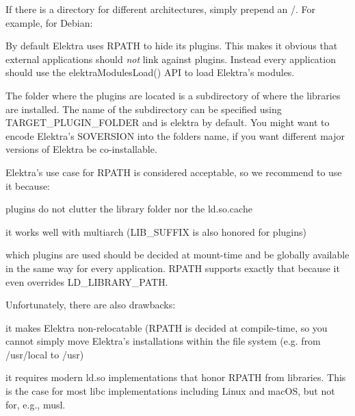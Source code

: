 \begin{DoxyCode}{0}
\end{DoxyCode}


If there is a directory for different architectures, simply prepend an {\ttfamily /}. For example, for Debian\+:


\begin{DoxyCode}{0}
\end{DoxyCode}


By default Elektra uses {\ttfamily R\+P\+A\+TH} to hide its plugins. This makes it obvious that external applications should {\itshape not} link against plugins. Instead every application should use the {\ttfamily elektra\+Modules\+Load()} A\+PI to load Elektra’s modules.

The folder where the plugins are located is a subdirectory of where the libraries are installed. The name of the subdirectory can be specified using {\ttfamily T\+A\+R\+G\+E\+T\+\_\+\+P\+L\+U\+G\+I\+N\+\_\+\+F\+O\+L\+D\+ER} and is {\ttfamily elektra} by default. You might want to encode Elektra’s {\ttfamily S\+O\+V\+E\+R\+S\+I\+ON} into the folders name, if you want different major versions of Elektra be co-\/installable.

Elektra’s use case for {\ttfamily R\+P\+A\+TH} is considered acceptable, so we recommend to use it because\+:


\begin{DoxyItemize}
\item plugins do not clutter the library folder nor the {\ttfamily ld.\+so.\+cache}
\item it works well with multiarch ({\ttfamily L\+I\+B\+\_\+\+S\+U\+F\+F\+IX} is also honored for plugins)
\item which plugins are used should be decided at mount-\/time and be globally available in the same way for every application. {\ttfamily R\+P\+A\+TH} supports exactly that because it even overrides {\ttfamily L\+D\+\_\+\+L\+I\+B\+R\+A\+R\+Y\+\_\+\+P\+A\+TH}.
\end{DoxyItemize}

Unfortunately, there are also drawbacks\+:


\begin{DoxyItemize}
\item it makes Elektra non-\/relocatable ({\ttfamily R\+P\+A\+TH} is decided at compile-\/time, so you cannot simply move Elektra’s installations within the file system (e.\+g. from {\ttfamily /usr/local} to {\ttfamily /usr})
\item it requires modern {\ttfamily ld.\+so} implementations that honor {\ttfamily R\+P\+A\+TH} from libraries. This is the case for most {\ttfamily libc} implementations including Linux and mac\+OS, but not for, e.\+g., {\ttfamily musl}.
\end{DoxyItemize}

